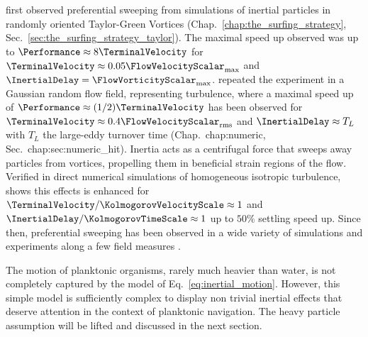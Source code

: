 \citet{maxey1986gravitational} first observed preferential sweeping from simulations of inertial particles in randomly oriented Taylor-Green Vortices (Chap.~\ref{chap:the_surfing_strategy}, Sec.~\ref{sec:the_surfing_strategy_taylor}).
The maximal speed up observed was up to $\Performance \approx 8 \TerminalVelocity$ for $\TerminalVelocity \approx 0.05 \FlowVelocityScalar_{\mathrm{max}}$ and $\InertialDelay = \FlowVorticityScalar_{\mathrm{max}}$.
\citet{maxey1987gravitational} repeated the experiment in a Gaussian random flow field, representing turbulence, where a maximal speed up of $\Performance \approx (1/2) \TerminalVelocity$ has been observed for $\TerminalVelocity \approx 0.4 \FlowVelocityScalar_{\mathrm{rms}}$ and $\InertialDelay \approx T_{L}$ with $T_{L}$ the large-eddy turnover time (Chap.~{chap:numeric}, Sec.~{chap:sec:numeric_hit}).
Inertia acts as a centrifugal force that sweeps away particles from vortices, propelling them in beneficial strain regions of the flow.
Verified in direct numerical simulations of homogeneous isotropic turbulence, \citet{wang1993settling} shows this effects is enhanced for $\TerminalVelocity / \KolmogorovVelocityScale \approx 1$ and $\InertialDelay / \KolmogorovTimeScale \approx 1$ up to $50\%$ settling speed up.
Since then, preferential sweeping has been observed in a wide variety of simulations \citep{ireland2016effect, tom2019multiscale, bragg2021mechanisms} and experiments \citep{sumbekova2017preferential, petersen2019experimental} along a few field measures \citep{li2021evidence}.

The motion of planktonic organisms, rarely much heavier than water, is not completely captured by the model of Eq.~\eqref{eq:inertial_motion}.
However, this simple model is sufficiently complex to display non trivial inertial effects that deserve attention in the context of planktonic navigation.
The heavy particle assumption will be lifted and discussed in the next section.

